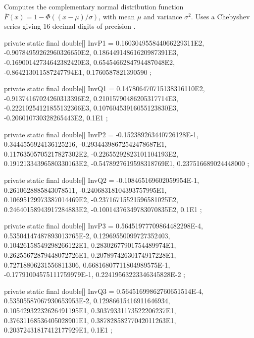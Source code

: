 \begin{tabb} Computes the complementary normal distribution function
  $\bar{F}(x) = 1 - \Phi ((x-\mu)/\sigma)$,
  with  mean $\mu$ and variance $\sigma^2$.
  Uses a Chebyshev series giving 16 decimal digits of
  precision \cite{tSCH78a}.
\end{tabb}
\begin{code}\begin{hide}
    private static final double[] InvP1 = {
        0.160304955844066229311E2,
       -0.90784959262960326650E2,
        0.18644914861620987391E3,
       -0.16900142734642382420E3,
        0.6545466284794487048E2,
       -0.864213011587247794E1,
        0.1760587821390590
    };

    private static final double[] InvQ1 = {
        0.147806470715138316110E2,
       -0.91374167024260313396E2,
        0.21015790486205317714E3,
       -0.22210254121855132366E3,
        0.10760453916055123830E3,
       -0.206010730328265443E2,
        0.1E1
    };

    private static final double[] InvP2 = {
       -0.152389263440726128E-1,
        0.3444556924136125216,
       -0.29344398672542478687E1,
        0.11763505705217827302E2,
       -0.22655292823101104193E2,
        0.19121334396580330163E2,
       -0.5478927619598318769E1,
        0.237516689024448000
    };

    private static final double[] InvQ2 = {
      -0.108465169602059954E-1,
       0.2610628885843078511,
      -0.24068318104393757995E1,
       0.10695129973387014469E2,
      -0.23716715521596581025E2,
       0.24640158943917284883E2,
      -0.10014376349783070835E2,
       0.1E1
    };

    private static final double[] InvP3 = {
        0.56451977709864482298E-4,
        0.53504147487893013765E-2,
        0.12969550099727352403,
        0.10426158549298266122E1,
        0.28302677901754489974E1,
        0.26255672879448072726E1,
        0.20789742630174917228E1,
        0.72718806231556811306,
        0.66816807711804989575E-1,
       -0.17791004575111759979E-1,
        0.22419563223346345828E-2
    };

    private static final double[] InvQ3 = {
        0.56451699862760651514E-4,
        0.53505587067930653953E-2,
        0.12986615416911646934,
        0.10542932232626491195E1,
        0.30379331173522206237E1,
        0.37631168536405028901E1,
        0.38782858277042011263E1,
        0.20372431817412177929E1,
        0.1E1
    };\end{hide}


\end{code}

